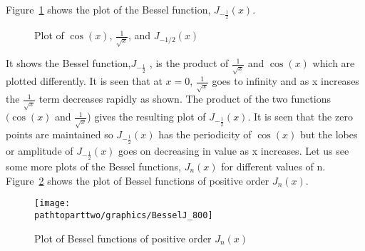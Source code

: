 Figure~\ref{fig:fig-1} shows the plot of the Bessel function, $ J_{-\frac{1}{2}}(x)$.
\begin{figure}[h]
\centering
{}
\caption{Plot of $\cos(x)$, $\frac{1}{\sqrt{x}}$, and $J_{-1/2}(x)$}
\label{fig:fig-1}
\end{figure}

It shows the Bessel function,$J_{-\frac{1}{2}}$ , is the product of $\frac{1}{\sqrt{x}}$ and $\cos(x)$ which are plotted differently. It is seen that at $x=0$, $\frac{1}{\sqrt{x}}$ goes to infinity and as x increases the $\frac{1}{\sqrt{x}}$ term decreases rapidly as shown. The product of the two functions $(\cos(x)$ and $\frac{1}{\sqrt{x}}$) gives the resulting plot of $J_{-\frac{1}{2}}(x)$. It is seen that the zero points are maintained so $J_{-\frac{1}{2}}(x)$ has the periodicity of $\cos(x)$ but the lobes or amplitude of $J_{-\frac{1}{2}}(x)$ goes on decreasing in value as x increases. Let us see some more plots of the Bessel functions, $J_n(x)$ for different values of n. Figure~\ref{fig:bessel-functions} shows the plot of Bessel functions of positive order $J_{n}(x)$.
\begin{figure}[h]
\centering
\texttt{[image: \\pathtoparttwo/graphics/BesselJ\_800]}
\caption{Plot of Bessel functions of positive order $J_{n}(x)$}
\label{fig:bessel-functions}
\end{figure}

